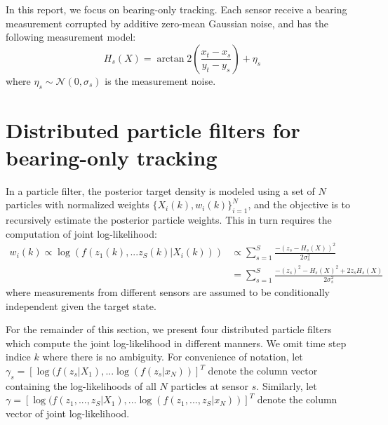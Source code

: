 \documentclass[10pt,letterpaper,final]{article}
\begin{document}
In this report, we focus on bearing-only tracking. Each sensor receive a bearing measurement corrupted by additive zero-mean Gaussian noise, and has the following measurement model:
\begin{equation}
H_s(X)= \arctan2 \left( \frac{x_t-x_s}{y_t-y_s} \right) + \eta_s
\label{eqn:bearing}
\end{equation}
where $\eta_s \sim \mathcal{N}(0, \sigma_s)$ is the measurement noise. 

\section{Distributed particle filters for bearing-only tracking}
\label{sec:pf}
In a particle filter, the posterior target density is modeled using a set of $N$ particles with normalized weights $\{X_i(k), w_i(k)\}_{i=1}^N$, and the objective is to recursively estimate the posterior particle weights. This in turn requires the computation of joint log-likelihood:
\begin{align}
w_i(k) \propto \log(f(z_1(k),...z_S(k)|X_i(k))) &\propto \sum_{s=1}^S \frac{-(z_s-H_s(X))^2}{2\sigma_s^2} \nonumber \\ 
&= \sum_{s=1}^S \frac{-(z_s)^2-H_s(X)^2+2z_sH_s(X)}{2\sigma_s^2} \label{eqn:log_lh_normal}
\end{align}
where measurements from different sensors are assumed to be conditionally independent given the target state. 

For the remainder of this section, we present four distributed particle filters which compute the joint log-likelihood in different manners. We omit time step indice $k$ where there is no ambiguity. For convenience of notation, let $\gamma_s = [\log (f(z_s|X_1), ... \log (f(z_s|x_N))]^T$ denote the column vector containing the log-likelihoods of all $N$ particles at sensor $s$. Similarly, let $\gamma = [\log (f(z_1, ..., z_S|X_1), ... \log (f(z_1, ..., z_S|x_N))]^T$ denote the column vector of joint log-likelihood. 
\end{document}
